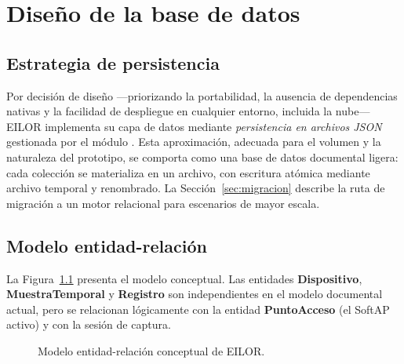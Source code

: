 \chapter{Diseño de la base de datos}
\label{cap:basedatos}

\section{Estrategia de persistencia}
Por decisión de diseño ---priorizando la portabilidad, la ausencia de dependencias nativas y la facilidad de despliegue en cualquier entorno, incluida la nube--- EILOR implementa su capa de datos mediante \emph{persistencia en archivos JSON} gestionada por el módulo . Esta aproximación, adecuada para el volumen y la naturaleza del prototipo, se comporta como una base de datos documental ligera: cada colección se materializa en un archivo, con escritura atómica mediante archivo temporal y renombrado. La Sección~\ref{sec:migracion} describe la ruta de migración a un motor relacional para escenarios de mayor escala.

\section{Modelo entidad-relación}
La Figura~\ref{fig:er} presenta el modelo conceptual. Las entidades \textbf{Dispositivo}, \textbf{MuestraTemporal} y \textbf{Registro} son independientes en el modelo documental actual, pero se relacionan lógicamente con la entidad \textbf{PuntoAcceso} (el SoftAP activo) y con la sesión de captura.

\begin{figure}[H]
\centering
{}
\caption{Modelo entidad-relación conceptual de EILOR.}
\label{fig:er}
\end{figure}

